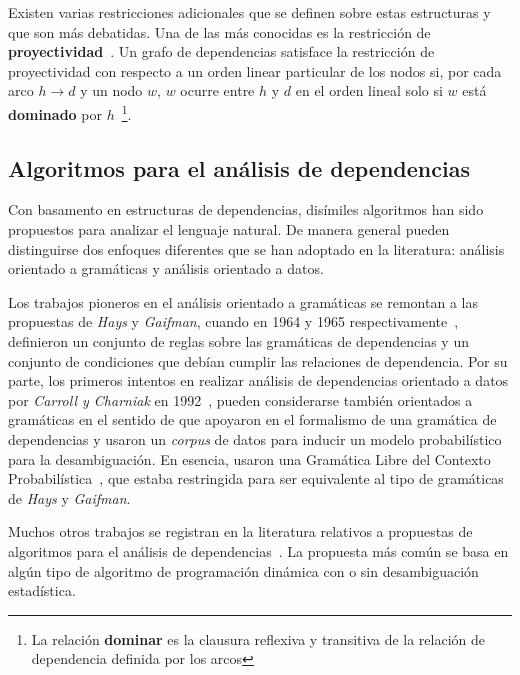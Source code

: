 Existen varias restricciones adicionales que se definen sobre estas estructuras y que son más debatidas. Una de las más conocidas es la restricción de \textbf{proyectividad}~\cite{hays1964dependency,lecerf1960programme,marcus1965notion}. Un grafo de dependencias satisface la restricción de proyectividad con respecto a un orden linear particular de los nodos si, por cada arco $h \rightarrow d$ y un nodo $w$, $w$ ocurre entre $h$ y $d$ en el orden lineal solo si $w$ está \textbf{dominado} por $h$~\footnote{La relación \textbf{dominar} es la clausura reflexiva y transitiva de la relación de dependencia definida por los arcos}. 

\subsection{Algoritmos para el análisis de dependencias}

Con basamento en estructuras de dependencias, disímiles algoritmos han sido propuestos para analizar el lenguaje natural.
De manera general pueden distinguirse dos enfoques diferentes que se han adoptado en la literatura: análisis orientado a gramáticas y análisis orientado a datos. 

Los trabajos pioneros en el análisis orientado a gramáticas se remontan a las propuestas de \textit{Hays} y \textit{Gaifman}, cuando en 1964 y 1965 respectivamente~\cite{hays1964dependency,gaifman1965dependency}, definieron un conjunto de reglas sobre las gramáticas de dependencias y un conjunto de condiciones que debían cumplir las relaciones de dependencia. Por su parte, los primeros intentos en realizar análisis de dependencias orientado a datos por \textit{Carroll y Charniak} en 1992~\cite{carroll1992two}, pueden considerarse también orientados a gramáticas en el sentido de que apoyaron en el formalismo de una gramática de dependencias y usaron un \emph{corpus} de datos para inducir un modelo probabilístico para la desambiguación. En esencia, usaron una Gramática Libre del Contexto Probabilística~\cite{chomsky1956three}, que estaba restringida para ser equivalente al tipo de gramáticas de \textit{Hays} y \textit{Gaifman}. 

Muchos otros trabajos se registran en la literatura relativos a propuestas de algoritmos para el análisis de dependencias~\cite{koo2008simple,mcdonald2005non,nivre2003efficient,nivre2007maltparser,socher2011parsing}. La propuesta más común se basa en algún tipo de algoritmo de programación dinámica con o sin desambiguación estadística.


